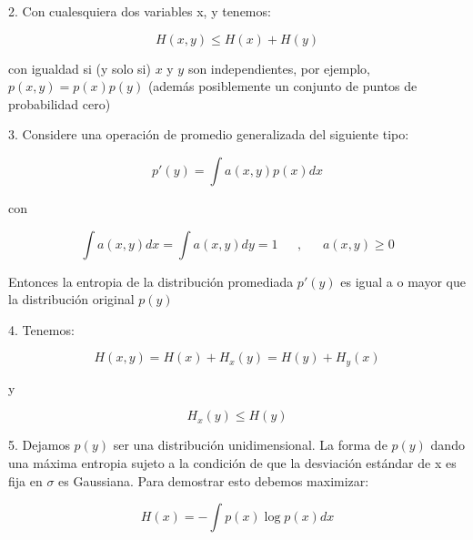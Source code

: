 2. Con cualesquiera dos variables x, y tenemos:

\begin{equation}
H\left ( x,y \right )\leq H\left ( x \right )+H\left ( y \right )
\end{equation}

con igualdad si (y solo si) $x$ y $y$ son independientes, por ejemplo, $p\left ( x,y \right )=p\left ( x \right )p\left ( y \right )$ (adem\'{a}s posiblemente un conjunto de puntos de probabilidad cero) \newline \newline

3. Considere una operaci\'{o}n de promedio generalizada del siguiente tipo:

\begin{equation}
{p}'\left ( y \right )=\int a\left ( x,y \right )p\left ( x \right )dx
\end{equation}

con

\begin{equation}
\int a\left ( x,y \right )dx=\int a\left ( x,y \right )dy=1
\:\:\:\:\:\:\:,\:\:\:\:\:\:\:
a\left ( x,y \right )\geq 0
\end{equation}

Entonces la entropia de la distribuci\'{o}n promediada ${p}'\left ( y \right )$ es igual a o mayor que la distribuci\'{o}n original $p\left ( y \right )$ \newline \newline

4. Tenemos:

\begin{equation}
H\left ( x,y \right )=H\left ( x \right )+H_{x}\left ( y \right )=H\left ( y \right )+H_{y}\left ( x \right )
\end{equation}

y

\begin{equation}
H_x{}\left ( y \right )\leq H\left ( y \right )
\end{equation}

5. Dejamos $p\left ( y \right )$ ser una distribuci\'{o}n unidimensional. La forma de $p\left ( y \right )$ dando una m\'{a}xima entropia sujeto a la condici\'{o}n de que la desviaci\'{o}n est\'{a}ndar de x es fija en $\sigma $ es Gaussiana. Para demostrar esto debemos maximizar:

\begin{equation}
H\left ( x \right )=-\int p\left ( x \right )\log p\left ( x \right )dx
\end{equation}


